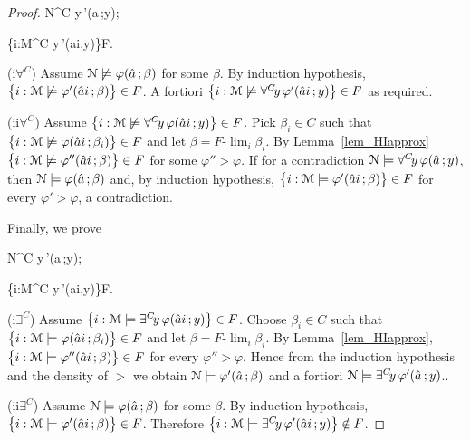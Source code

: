 \documentclass[12pt,letterpaper,oneside,reqno]{amsart}
\theoremstyle{plain}
\theoremstyle{remark}
\begin{document}
\begin{proof}
  {\Rightarrow}
  {{\EuScript N}\models\forall^C\! y\,\varphi'(\hat a\,;y)};

  {\Rightarrow}
  {\big\{i:{\EuScript M}\models\forall^C\! y\,\varphi'(\hat ai,y)\big\}\in F}.
  
  (\textsf{i}$\forall^C$) Assume ${\EuScript N}\not\models\varphi(\hat a\,;  \beta)$ for some $\beta$.
  By induction hypothesis, $\big\{ i: {\EuScript M}\not\models\varphi'(\hat ai\,;\beta)\big\}\in F$.
  A fortiori $\big\{ i:{\EuScript M}\not\models\forall^C\!y\,\varphi'(\hat ai\,;y)\big\}\in F$ as required.

  (\textsf{ii}$\forall^C$) Assume $\big\{ i:{\EuScript M}\not\models\forall^C\!y\,\varphi(\hat ai\,;y)\big\}\in F$.
  Pick $\beta_i\in C$ such that $\big\{ i:{\EuScript M}\not\models\varphi(\hat ai\,;\beta_i)\big\}\in F$ and let $\beta=F\mbox{-}\lim_i\beta_i$.
  By Lemma~\ref{lem_HIapprox} $\big\{ i:{\EuScript M}\not\models\varphi''(\hat ai\,;\beta)\big\}\in F$ for some $\varphi''>\varphi$.
  If for a contradiction ${\EuScript N}\models\forall^C\!y\,\varphi(\hat a\,;y)$, 
  then ${\EuScript N}\models\varphi(\hat a\,;\beta)$ and, by induction hypothesis, $\big\{ i:{\EuScript M}\models\varphi'(\hat ai\,;\beta)\big\}\in F$ for every $\varphi'>\varphi$, a contradiction.
  
  Finally, we prove
  
  {\Rightarrow}
  {{\EuScript N}\models\exists^C\! y\,\varphi'(\hat a\,;y)};

  {\Rightarrow}
  {\big\{i:{\EuScript M}\models\exists^C\! y\,\varphi'(\hat ai,y)\big\}\in F}.
  
  (\textsf{i}$\exists^C$) Assume $\big\{ i:{\EuScript M}\models\exists^C\!y\,\varphi(\hat ai\,;y)\big\}\in F$.
  Choose $\beta_i\in C$ such that $\big\{ i:{\EuScript M}\models\varphi(\hat ai\,;\beta_i)\big\}\in F$ and let $\beta=F\mbox{-}\lim_i\beta_i$.
  By Lemma~\ref{lem_HIapprox}, $\big\{ i:{\EuScript M}\models\varphi''(\hat ai\,;\beta)\big\}\in F$ for every $\varphi''>\varphi$.
  Hence from the induction hypothesis and the density of $>$ we obtain ${\EuScript N}\models\varphi'(\hat a\,;\beta)$ and a fortiori ${\EuScript N}\models\exists^C\! y\,\varphi'(\hat a\,;y)$..
  
  (\textsf{ii}$\exists^C$) Assume ${\EuScript N}\models\varphi(\hat a\,;  \beta)$ for some $\beta$.
  By induction hypothesis, $\big\{ i: {\EuScript M}\models\varphi'(\hat ai\,;\beta)\big\}\in F$.
  Therefore $\big\{ i:{\EuScript M}\models\exists^C\!y\,\varphi'(\hat ai\,;y)\big\}\notin F$.
\end{proof}
\end{document}
